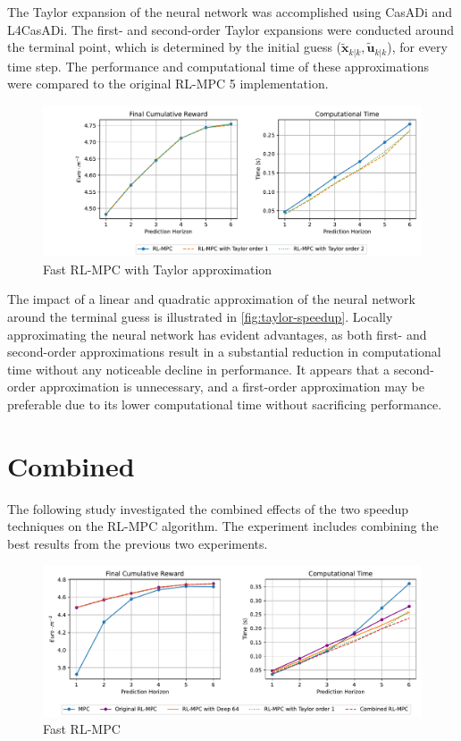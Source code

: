 The Taylor expansion of the neural network was accomplished using CasADi and L4CasADi. The first- and second-order Taylor expansions were conducted around the terminal point, which is determined by the initial guess ($\tilde{\mathbf{x}}_{k|k},\tilde{\mathbf{u}}_{k|k}$), for every time step. The performance and computational time of these approximations were compared to the original RL-MPC 5 implementation.

\begin{figure}[H]
	\centering
	\includegraphics[width=\textwidth]{figures/taylor_speed_up.pdf}
	\caption{Fast RL-MPC with Taylor approximation}
	\label{fig:taylor-speedup}
\end{figure}

The impact of a linear and quadratic approximation of the neural network around the terminal guess is illustrated in \autoref{fig:taylor-speedup}. Locally approximating the neural network has evident advantages, as both first- and second-order approximations result in a substantial reduction in computational time without any noticeable decline in performance. It appears that a second-order approximation is unnecessary, and a first-order approximation may be preferable due to its lower computational time without sacrificing performance.


\section{Combined}
The following study investigated the combined effects of the two speedup techniques on the RL-MPC algorithm. The experiment includes combining the best results from the previous two experiments.


\begin{figure}[H]
	\centering
	\includegraphics[width=\textwidth]{figures/final_speed_up.pdf}
	\caption{Fast RL-MPC}
	\label{fig:final-speedup}
\end{figure}

